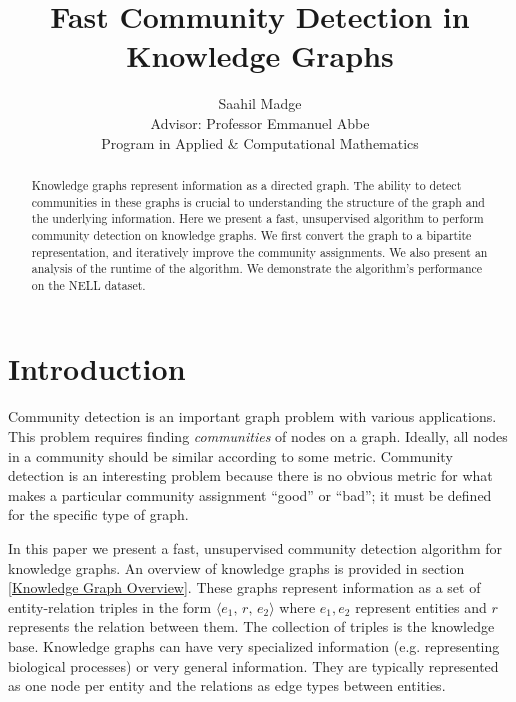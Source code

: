 \documentclass[12pt]{article}
\begin{document}
\title{Fast Community Detection in Knowledge Graphs}
\author{Saahil Madge\\ Advisor: Professor Emmanuel Abbe\\ Program in Applied \& Computational Mathematics}
\date{}
\maketitle

\begin{abstract}

    Knowledge graphs represent information as a directed graph. The ability to
    detect communities in these graphs is crucial to understanding the structure
    of the graph and the underlying information. Here we present a fast,
    unsupervised algorithm to perform community detection on knowledge graphs.
    We first convert the graph to a bipartite representation, and iteratively
    improve the community assignments. We also present an analysis of the
    runtime of the algorithm. We demonstrate the algorithm's performance on the
    NELL dataset.

\end{abstract}

\doublespacing

\section{Introduction}
\label{Introduction}

Community detection is an important graph problem with various applications.
This problem requires finding \textit{communities} of nodes on a graph. Ideally,
all nodes in a community should be similar according to some metric. Community
detection is an interesting problem because there is no obvious metric for
what makes a particular community assignment ``good'' or ``bad''; it must be
defined for the specific type of graph.

In this paper we present a fast, unsupervised community detection algorithm for
knowledge graphs. An overview of knowledge graphs is provided in section
\ref{Knowledge Graph Overview}. These graphs represent information as a set of
entity-relation triples in the form $\langle e_1,\,r,\,e_2 \rangle$ where
$e_1,e_2$ represent entities and $r$ represents the relation between them. The
collection of triples is the knowledge base. Knowledge graphs can have very
specialized information (e.g. representing biological processes) or very general
information. They are typically represented as one node per entity and the
relations as edge types between entities.
\end{document}
